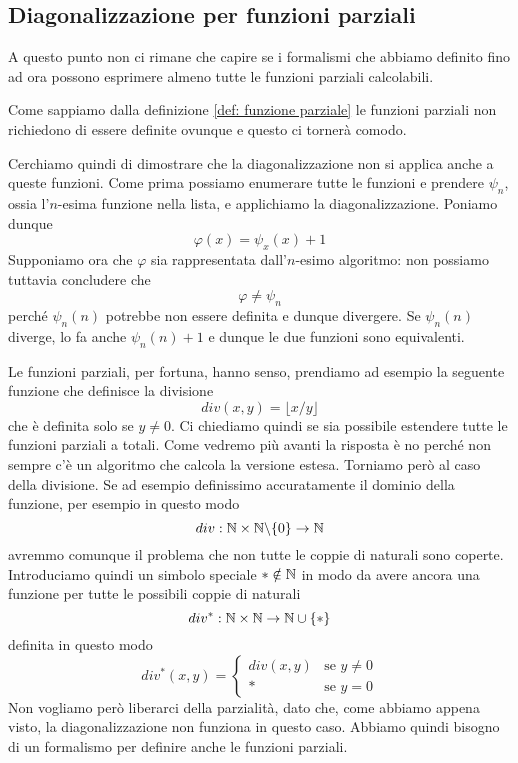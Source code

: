 \subsection{Diagonalizzazione per funzioni parziali}
A questo punto non ci rimane che capire se i formalismi che
abbiamo definito fino ad ora possono esprimere almeno tutte
le funzioni parziali calcolabili.

Come sappiamo dalla definizione \ref{def: funzione parziale}
le funzioni parziali non richiedono di essere definite ovunque
e questo ci tornerà comodo.

Cerchiamo quindi di dimostrare che la diagonalizzazione non si
applica anche a queste funzioni. Come prima possiamo enumerare
tutte le funzioni e prendere $\psi_n$, ossia l'$n$-esima
funzione nella lista, e applichiamo la diagonalizzazione.
Poniamo dunque
\[ \varphi (x) = \psi_x (x) + 1 \]
Supponiamo ora che $\varphi$ sia rappresentata dall'$n$-esimo
algoritmo: non possiamo tuttavia concludere che
\[ \varphi \neq \psi_n \]
perché $\psi_n(n)$ potrebbe non essere definita e dunque
divergere. Se $\psi_n(n)$ diverge, lo fa anche $\psi_n(n)+1$
e dunque le due funzioni sono equivalenti.

Le funzioni parziali, per fortuna, hanno senso, prendiamo ad
esempio la seguente funzione che definisce la divisione
\[ div (x,y) = \lfloor x / y \rfloor \]
che è definita solo se $y \neq 0$. Ci chiediamo quindi se sia
possibile estendere tutte le funzioni parziali a totali. Come
vedremo più avanti la risposta è no perché non sempre c'è un
algoritmo che calcola la versione estesa. Torniamo però al caso
della divisione. Se ad esempio definissimo accuratamente il
dominio della funzione, per esempio in questo modo
\[ div : \mathbb{N} \times \mathbb{N} \backslash \{ 0 \} \to \mathbb{N} \]
avremmo comunque il problema che non tutte le coppie di naturali
sono coperte. Introduciamo quindi un simbolo speciale
$* \notin \mathbb{N}$ in modo da avere ancora una funzione per tutte le
possibili coppie di naturali
\[ div^* : \mathbb{N} \times \mathbb{N} \to \mathbb{N} \cup \{ * \} \]
definita in questo modo
\[
	div^* (x, y) = \begin{cases}
		div(x, y) & \text{se } y \neq 0 \\
		*         & \text{se } y = 0
	\end{cases}
\]
Non vogliamo però liberarci della parzialità, dato che, come
abbiamo appena visto, la diagonalizzazione non funziona in
questo caso. Abbiamo quindi bisogno di un formalismo per
definire anche le funzioni parziali.

